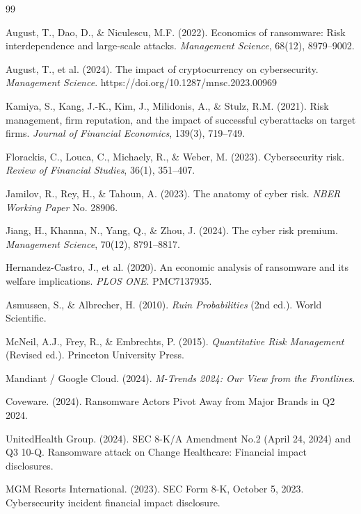 \documentclass[a4paper,11pt]{article}
\theoremstyle{definition}
\begin{document}
\begin{thebibliography}{99}

August, T., Dao, D., \& Niculescu, M.F. (2022).
Economics of ransomware: Risk interdependence and large-scale attacks.
\textit{Management Science}, 68(12), 8979--9002.

August, T., et al. (2024).
The impact of cryptocurrency on cybersecurity.
\textit{Management Science}. https://doi.org/10.1287/mnsc.2023.00969

Kamiya, S., Kang, J.-K., Kim, J., Milidonis, A., \& Stulz, R.M. (2021).
Risk management, firm reputation, and the impact of successful cyberattacks on target firms.
\textit{Journal of Financial Economics}, 139(3), 719--749.

Florackis, C., Louca, C., Michaely, R., \& Weber, M. (2023).
Cybersecurity risk.
\textit{Review of Financial Studies}, 36(1), 351--407.

Jamilov, R., Rey, H., \& Tahoun, A. (2023).
The anatomy of cyber risk.
\textit{NBER Working Paper} No. 28906.

Jiang, H., Khanna, N., Yang, Q., \& Zhou, J. (2024).
The cyber risk premium.
\textit{Management Science}, 70(12), 8791--8817.

Hernandez-Castro, J., et al. (2020).
An economic analysis of ransomware and its welfare implications.
\textit{PLOS ONE}. PMC7137935.

Asmussen, S., \& Albrecher, H. (2010).
\textit{Ruin Probabilities} (2nd ed.). World Scientific.

McNeil, A.J., Frey, R., \& Embrechts, P. (2015).
\textit{Quantitative Risk Management} (Revised ed.). Princeton University Press.

Mandiant / Google Cloud. (2024).
\textit{M-Trends 2024: Our View from the Frontlines}.

Coveware. (2024).
Ransomware Actors Pivot Away from Major Brands in Q2 2024.

UnitedHealth Group. (2024).
SEC 8-K/A Amendment No.2 (April 24, 2024) and Q3 10-Q.
Ransomware attack on Change Healthcare: Financial impact disclosures.

MGM Resorts International. (2023).
SEC Form 8-K, October 5, 2023.
Cybersecurity incident financial impact disclosure.


\end{thebibliography}
\end{document}

